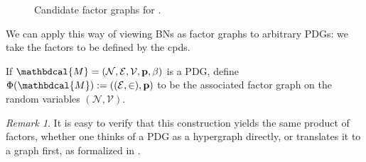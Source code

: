 \documentclass[letterpaper]{article} %
\theoremstyle{plain}
\theoremstyle{definition}
\theoremstyle{remark}
\newtheorem*{remark}{Remark}
\newcommand\mat[1]{\mathbf{#1}}
\newcommand{\V}{\mathcal V}
\newcommand{\N}{\mathcal N}
\newcommand{\Ed}{\mathcal E}
\newcommand{\pdgvars}[1][]{(\N#1, \Ed#1, \V#1, \mat p#1, \beta#1)}
\newcommand{\dg}[1]{\mathbdcal{#1}}
\begin{document}
{\begin{figure}[htb]
\begin{subfigure}[b]{0.3\linewidth}
{}
		\caption{}\label{subfig:fg-smoking}
	\end{subfigure}%
	\caption{Candidate factor graphs for .
	}
	\label{fig:fg-intro-examples}
\end{figure}

We can apply this way of viewing BNs as factor graphs to arbitrary
PDGs: we take the factors to be defined by the cpds.
\begin{defn}
	If $\dg M = \pdgvars[]$ is a PDG, define 
	$ \Phi(\dg M) := ((\Ed,\in), \mat p)$
	to be the associated factor graph on the random
			variables $(\N, \V)$. 
\end{defn}
\begin{remark}
	It is easy to verify that this construction yields the 
			same product of factors, whether one thinks of a PDG
			as a hypergraph directly, or translates it to a graph
			first, as formalized in . 
\end{remark}

}
\end{document}

